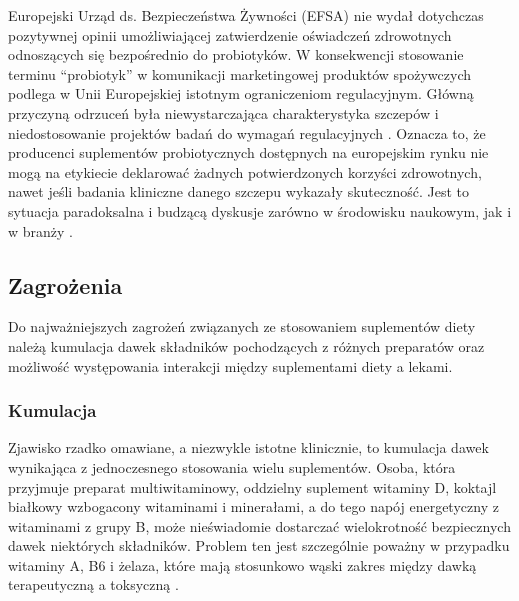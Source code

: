 Europejski Urząd ds. Bezpieczeństwa Żywności (EFSA) nie wydał dotychczas pozytywnej opinii umożliwiającej zatwierdzenie oświadczeń zdrowotnych odnoszących się bezpośrednio do probiotyków. W konsekwencji stosowanie terminu \enquote{probiotyk} w komunikacji marketingowej produktów spożywczych podlega w Unii Europejskiej istotnym ograniczeniom regulacyjnym. Główną przyczyną odrzuceń była niewystarczająca charakterystyka szczepów i niedostosowanie projektów badań do wymagań regulacyjnych \cite{rijkers2011health}. Oznacza to, że producenci suplementów probiotycznych dostępnych na europejskim rynku nie mogą na etykiecie deklarować żadnych potwierdzonych korzyści zdrowotnych, nawet jeśli badania kliniczne danego szczepu wykazały skuteczność. Jest to sytuacja paradoksalna i budzącą dyskusje zarówno w środowisku naukowym, jak i w branży \cite{rijkers2011health}.



\subsection{Zagrożenia}

Do najważniejszych zagrożeń związanych ze stosowaniem suplementów diety należą kumulacja dawek składników pochodzących z różnych preparatów oraz możliwość występowania interakcji między suplementami diety a lekami.

\subsubsection{Kumulacja}

Zjawisko rzadko omawiane, a niezwykle istotne klinicznie, to kumulacja dawek wynikająca z jednoczesnego stosowania wielu suplementów. Osoba, która przyjmuje preparat multiwitaminowy, oddzielny suplement witaminy D, koktajl białkowy wzbogacony witaminami i minerałami, a do tego napój energetyczny z witaminami z grupy B, może nieświadomie dostarczać wielokrotność bezpiecznych dawek niektórych składników. Problem ten jest szczególnie poważny w przypadku witaminy A, B6 i żelaza, które mają stosunkowo wąski zakres między dawką terapeutyczną a toksyczną \cite{navarro2017liver}.


